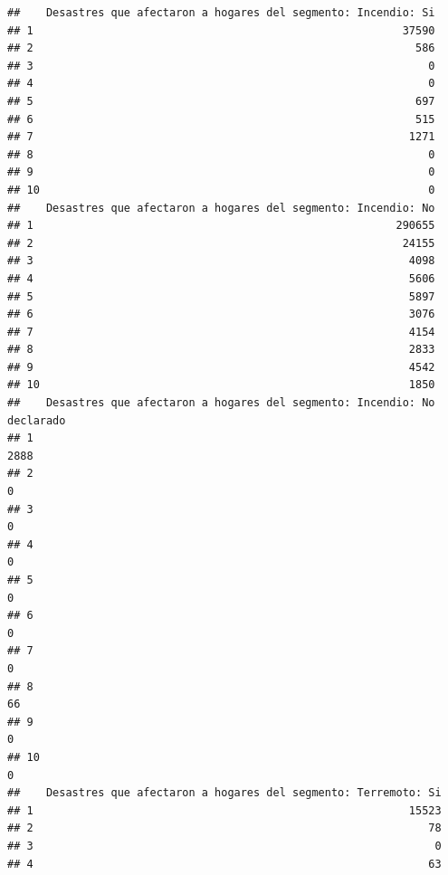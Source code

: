 \documentclass[11pt,]{article}
\begin{document}
\begin{verbatim}
##    Desastres que afectaron a hogares del segmento: Incendio: Si
## 1                                                         37590
## 2                                                           586
## 3                                                             0
## 4                                                             0
## 5                                                           697
## 6                                                           515
## 7                                                          1271
## 8                                                             0
## 9                                                             0
## 10                                                            0
##    Desastres que afectaron a hogares del segmento: Incendio: No
## 1                                                        290655
## 2                                                         24155
## 3                                                          4098
## 4                                                          5606
## 5                                                          5897
## 6                                                          3076
## 7                                                          4154
## 8                                                          2833
## 9                                                          4542
## 10                                                         1850
##    Desastres que afectaron a hogares del segmento: Incendio: No declarado
## 1                                                                    2888
## 2                                                                       0
## 3                                                                       0
## 4                                                                       0
## 5                                                                       0
## 6                                                                       0
## 7                                                                       0
## 8                                                                      66
## 9                                                                       0
## 10                                                                      0
##    Desastres que afectaron a hogares del segmento: Terremoto: Si
## 1                                                          15523
## 2                                                             78
## 3                                                              0
## 4                                                             63

\end{verbatim}
\end{document}
